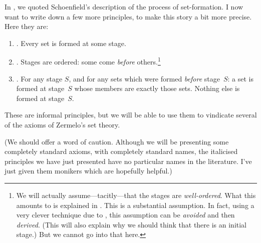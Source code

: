 \documentclass[../../../include/open-logic-section]{subfiles}
\begin{document}
	
In , we quoted Schoenfield's
description of the process of set-formation. I now want to write down
a few more principles, to make this story a bit more precise. Here
they are:
\begin{enumerate}
\item[] \stageshier. Every set is formed at some stage.
\item[] \stagesord. Stages are ordered: some come \emph{before}
others.\footnote{We will actually assume---tacitly---that the stages
are \emph{well-ordered}. What this amounts to is explained in
. This is a substantial assumption. In fact,
using a very clever technique due to \citet{Scott1974}, this
assumption can be \emph{avoided} and then \emph{derived}. (This will
also explain why we should think that there is an initial stage.) But
we cannot go into that here.} 
\item[] \stagesacc. For any stage $S$, and for any sets which were
formed \emph{before} stage~$S$: a set is formed at stage~$S$ whose
members are exactly those sets. Nothing else is formed at stage~$S$.
\end{enumerate}
These are informal principles, but we will be able to use them to
vindicate several of the axioms of Zermelo's set theory. 

(We should offer a word of caution. Although we will be presenting some
completely standard axioms, with completely standard names, the
italicised principles we have just presented have no particular names
in the literature. I've just given them monikers which are hopefully
helpful.)
\end{document}
